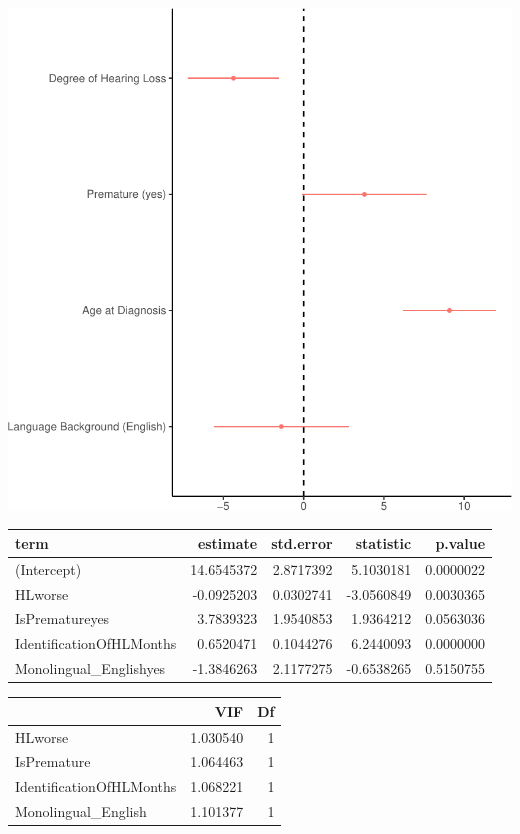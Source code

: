 \documentclass[english,man]{apa6}
\begin{document}
\includegraphics{ELSSP_paper_files/figure-latex/intervention-betas-1.pdf}

\begin{table}[H]
\centering
\begin{tabular}{l|r|r|r|r}
\hline
term & estimate & std.error & statistic & p.value\\
\hline
(Intercept) & 14.6545372 & 2.8717392 & 5.1030181 & 0.0000022\\
\hline
HLworse & -0.0925203 & 0.0302741 & -3.0560849 & 0.0030365\\
\hline
IsPrematureyes & 3.7839323 & 1.9540853 & 1.9364212 & 0.0563036\\
\hline
IdentificationOfHLMonths & 0.6520471 & 0.1044276 & 6.2440093 & 0.0000000\\
\hline
Monolingual\_Englishyes & -1.3846263 & 2.1177275 & -0.6538265 & 0.5150755\\
\hline
\end{tabular}
\end{table}

\begin{table}[H]
\centering
\begin{tabular}{l|r|r}
\hline
  & VIF & Df\\
\hline
HLworse & 1.030540 & 1\\
\hline
IsPremature & 1.064463 & 1\\
\hline
IdentificationOfHLMonths & 1.068221 & 1\\
\hline
Monolingual\_English & 1.101377 & 1\\
\hline
\end{tabular}
\end{table}
\end{document}
